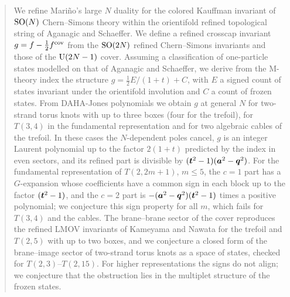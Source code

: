 \begin{abstract}
We refine Mari\~no's large $N$ duality for the colored Kauffman invariant of $\SO(N)$ Chern--Simons theory within the orientifold refined topological string of Aganagic and Schaeffer. We define a refined crosscap invariant $g = f - \tfrac12 f^{\cov}$ from the $\SO(2N)$ refined Chern--Simons invariants and those of the $\U(2N-1)$ cover. Assuming a classification of one-particle states modelled on that of Aganagic and Schaeffer, we derive from the M-theory index the structure $g = \tfrac12 E/(1+t) + C$, with $E$ a signed count of states invariant under the orientifold involution and $C$ a count of frozen states. From DAHA-Jones polynomials we obtain $g$ at general $N$ for two-strand torus knots with up to three boxes (four for the trefoil), for $T(3,4)$ in the fundamental representation and for two algebraic cables of the trefoil. In these cases the $N$-dependent poles cancel, $g$ is an integer Laurent polynomial up to the factor $2(1+t)$ predicted by the index in even sectors, and its refined part is divisible by $(\bt^2 - 1)(\ba^2 - \bq^2)$. For the fundamental representation of $T(2,2m+1)$, $m \le 5$, the $c = 1$ part has a $G$-expansion whose coefficients have a common sign in each block up to the factor $(\bt^2-1)$, and the $c = 2$ part is $-(\ba^2 - \bq^2)(\bt^2 - 1)$ times a positive polynomial; we conjecture this sign property for all $m$, which fails for $T(3,4)$ and the cables. The brane--brane sector of the cover reproduces the refined LMOV invariants of Kameyama and Nawata for the trefoil and $T(2,5)$ with up to two boxes, and we conjecture a closed form of the brane--image sector of two-strand torus knots as a space of states, checked for $T(2,3)$--$T(2,15)$. For higher representations the signs do not align; we conjecture that the obstruction lies in the multiplet structure of the frozen states.
\end{abstract}

